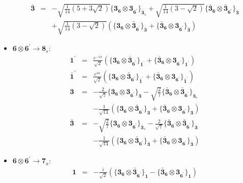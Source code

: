 \documentclass[english]{article}
\newcommand{\subcg}[3]{\big\{ {#1}\otimes{#2}\big\}^{}_{#3}}
\newcommand{\rep}[1]{\mathbf{#1}}
\begin{document}
\begin{itemize}
\begin{eqnarray*}
\\
\rep{\bar{3}} &=& -\sqrt{\frac{1}{14} \left(5+3 \sqrt{2}\right)}\subcg{\rep{3}_{\rep{6}}}{\rep{3}_{\rep{6^{\prime}}}}{\rep{\bar{3}}_{s}}+\sqrt{\frac{1}{14} \left(3-\sqrt{2}\right)}\subcg{\rep{\bar{3}}_{\rep{6}}}{\rep{\bar{3}}_{\rep{6^{\prime}}}}{\rep{\bar{3}}} \\ 
 & & +\sqrt{\frac{1}{14} \left(3-\sqrt{2}\right)}\left(\subcg{\rep{3}_{\rep{6}}}{\rep{\bar{3}}_{\rep{6^{\prime}}}}{\rep{\bar{3}}}+\subcg{\rep{\bar{3}}_{\rep{6}}}{\rep{3}_{\rep{6^{\prime}}}}{\rep{\bar{3}}}\right)
\end{eqnarray*}
\item $\rep{6}\otimes\rep{6^{\prime}}\to\rep{8}_{s}$:
\begin{eqnarray*}
\rep{1^{\prime}} &=& \frac{e^{-i \alpha }}{\sqrt{2}}\left(\subcg{\rep{3}_{\rep{6}}}{\rep{\bar{3}}_{\rep{6^{\prime}}}}{\rep{1^{\prime}}}+\subcg{\rep{\bar{3}}_{\rep{6}}}{\rep{3}_{\rep{6^{\prime}}}}{\rep{1^{\prime}}}\right)
\\
\rep{\bar{1}^{\prime}} &=& \frac{e^{i \alpha }}{\sqrt{2}}\left(\subcg{\rep{3}_{\rep{6}}}{\rep{\bar{3}}_{\rep{6^{\prime}}}}{\rep{\bar{1}^{\prime}}}+\subcg{\rep{\bar{3}}_{\rep{6}}}{\rep{3}_{\rep{6^{\prime}}}}{\rep{\bar{1}^{\prime}}}\right)
\\
\rep{3} &=& -\frac{2}{\sqrt{7}}\subcg{\rep{3}_{\rep{6}}}{\rep{3}_{\rep{6^{\prime}}}}{\rep{3}}-\sqrt{\frac{2}{7}}\subcg{\rep{\bar{3}}_{\rep{6}}}{\rep{\bar{3}}_{\rep{6^{\prime}}}}{\rep{3}_{s}} \\ 
 & & -\frac{1}{\sqrt{14}}\left(\subcg{\rep{3}_{\rep{6}}}{\rep{\bar{3}}_{\rep{6^{\prime}}}}{\rep{3}}+\subcg{\rep{\bar{3}}_{\rep{6}}}{\rep{3}_{\rep{6^{\prime}}}}{\rep{3}}\right)
\\
\rep{\bar{3}} &=& -\sqrt{\frac{2}{7}}\subcg{\rep{3}_{\rep{6}}}{\rep{3}_{\rep{6^{\prime}}}}{\rep{\bar{3}}_{s}}-\frac{2}{\sqrt{7}}\subcg{\rep{\bar{3}}_{\rep{6}}}{\rep{\bar{3}}_{\rep{6^{\prime}}}}{\rep{\bar{3}}} \\ 
 & & -\frac{1}{\sqrt{14}}\left(\subcg{\rep{3}_{\rep{6}}}{\rep{\bar{3}}_{\rep{6^{\prime}}}}{\rep{\bar{3}}}+\subcg{\rep{\bar{3}}_{\rep{6}}}{\rep{3}_{\rep{6^{\prime}}}}{\rep{\bar{3}}}\right)
\end{eqnarray*}
\item $\rep{6}\otimes\rep{6^{\prime}}\to\rep{7}_{a}$:
\begin{eqnarray*}
\rep{1} &=& -\frac{i}{\sqrt{2}}\left(\subcg{\rep{3}_{\rep{6}}}{\rep{\bar{3}}_{\rep{6^{\prime}}}}{\rep{1}}-\subcg{\rep{\bar{3}}_{\rep{6}}}{\rep{3}_{\rep{6^{\prime}}}}{\rep{1}}\right)
\\

\end{eqnarray*}
\end{itemize}
\end{document}
